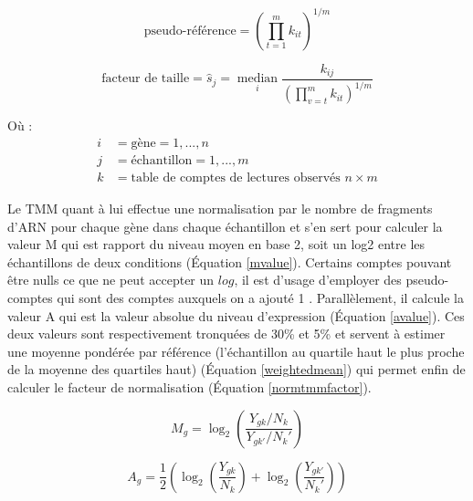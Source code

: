 \begin{equation}\label{pseudoref}
    \text{pseudo-référence} = \left(\prod_{t=1}^{m} k_{i t}\right)^{1 / m}
\end{equation}

\begin{equation}\label{sizefactor}
    \text{facteur de taille} = \hat{s}_{j}=\underset{i}{\operatorname{median}} \frac{k_{i j}}{\left(\prod_{v=t}^{m} k_{i t}\right)^{1 / m}}
\end{equation}


Où :
\begin{align*}
i & = \text{gène} = 1,..., n \\
j & = \text{échantillon} = 1,..., m \\
k & = \text{table de comptes de lectures observés } n \times m 
\end{align*}

Le TMM quant à lui effectue une normalisation par le nombre de fragments d'ARN pour chaque gène dans chaque échantillon et s'en sert pour calculer la valeur M qui est rapport du niveau moyen en base 2, soit un log2 entre les échantillons de deux conditions (Équation \ref{mvalue}). Certains comptes pouvant être nulls ce que ne peut accepter un $log$, il est d'usage d'employer des pseudo-comptes qui sont des comptes auxquels on a ajouté 1 \cite{Booeshaghi2021Mar}. Parallèlement, il calcule la valeur A qui est la valeur absolue du niveau d'expression (Équation \ref{avalue}). Ces deux valeurs sont respectivement tronquées de 30\% et 5\% et servent à estimer une moyenne pondérée par référence (l'échantillon au quartile haut le plus proche de la moyenne des quartiles haut) (Équation \ref{weightedmean}) qui permet enfin de calculer le facteur de normalisation (Équation \ref{normtmmfactor}).

\begin{equation}\label{mvalue}
    M_g = \log_{2} \left(\frac{Y_{gk} / N_k}{Y_{gk'} / N_k'}\right)
\end{equation}

\begin{equation}\label{avalue}
    A_g = \frac{1}{2} \left(\log_{2} \left(\frac{Y_{gk}}{N_k} \right) + \log_2 \left(\frac{Y_{gk'}}{N_k'}\right)\right)
\end{equation}

